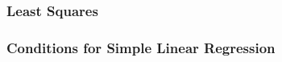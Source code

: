 \documentclass[handout]{beamer}
\newcommand{\blue}[1]{\textcolor{blue2}{#1}}
\begin{document}


\begin{frame}[fragile]
\frametitle{Least Squares}
%
%
%
%
\end{frame}


\begin{frame}[fragile]
\frametitle{Conditions for Simple Linear Regression}
%


\end{frame}
\end{document}
